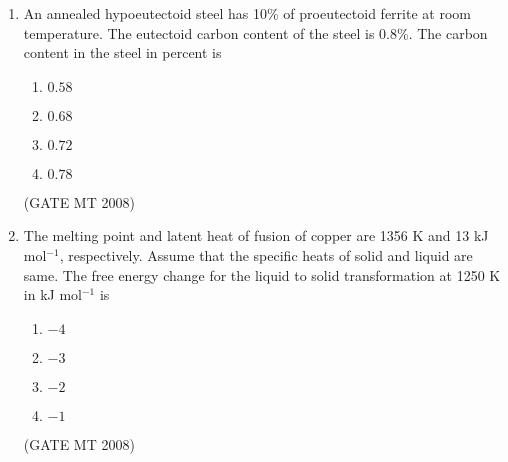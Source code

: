 \documentclass[11pt, letterpaper]{article}
\theoremstyle{remark}
\begin{document}
\begin{enumerate}[label=Q.\arabic*]
\item An annealed hypoeutectoid steel has 10\% of proeutectoid ferrite at room temperature. The eutectoid carbon content of the steel is 0.8\%. The carbon content in the steel in percent is
    \vspace{-0.9em}
    \begin{multicols}{4}
        \begin{enumerate}[label=(\MakeUppercase{\alph*})]
            \item $0.58$ 
            \item $0.68$ 
            \item $0.72$ 
            \item $0.78$
        \end{enumerate}
    \end{multicols}
    \vspace{-5mm}
   \hfill(GATE MT 2008) 
    \item The melting point and latent heat of fusion of copper are 1356 K and 13 kJ mol$^{-1}$, respectively. 
    Assume that the specific heats of solid and liquid are same. 
    The free energy change for the liquid to solid transformation at 1250 K in kJ mol$^{-1}$ is
    \vspace{-0.9em}
    \begin{multicols}{4}
        \begin{enumerate}[label=(\MakeUppercase{\alph*})]
            \item $-4$
            \item $-3$
            \item $-2$
            \item $-1$
        \end{enumerate}
    \end{multicols}
    \vspace{-5mm}
   \hfill(GATE MT 2008) 
   

\end{enumerate}
\end{document}
